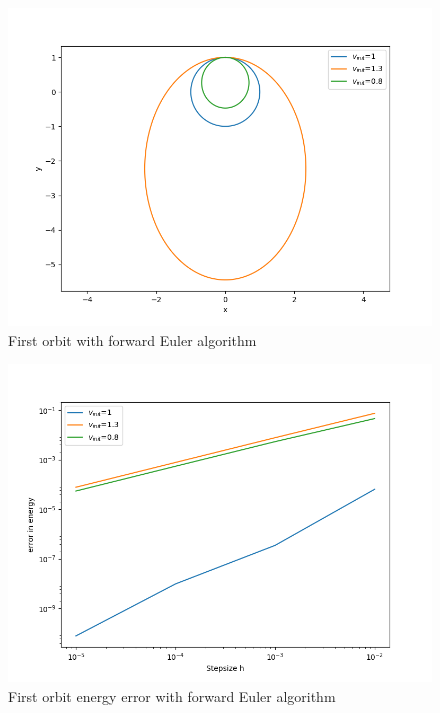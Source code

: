 \documentclass[11pt, a4paper, reqno]{scrartcl}
\begin{document}
    		\begin{figure}[H]
    			\centering
    			\includegraphics[height=.33\paperheight]{fig_a1.png}
    			\caption{First orbit with forward Euler algorithm}
    		\end{figure}
    		
    		\begin{figure}[H]
    			\centering
    			\includegraphics[height=.33\paperheight]{fig_a2.png}
    			\caption{First orbit energy error with forward Euler algorithm}
    		\end{figure}
    		
    		
    		
    		
    	\newpage
    		
\end{document}
